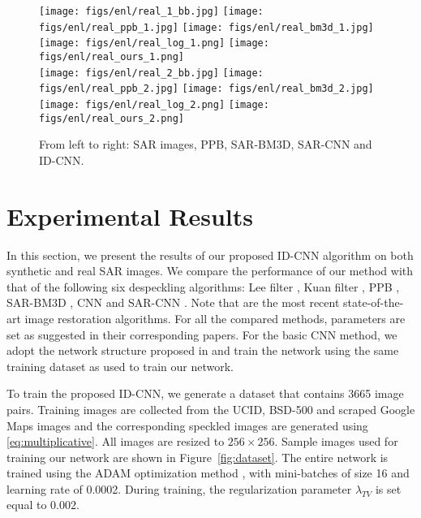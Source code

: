 \documentclass[journal]{IEEEtran}
\begin{document}
\begin{figure*}[htp!]
 \centering
 \texttt{[image: figs/enl/real\_1\_bb.jpg]}
 \texttt{[image: figs/enl/real\_ppb\_1.jpg]}
\texttt{[image: figs/enl/real\_bm3d\_1.jpg]}
\texttt{[image: figs/enl/real\_log\_1.png]}
\texttt{[image: figs/enl/real\_ours\_1.png]}\\
\vspace{0.5em}
 \texttt{[image: figs/enl/real\_2\_bb.jpg]}
 \texttt{[image: figs/enl/real\_ppb\_2.jpg]}
\texttt{[image: figs/enl/real\_bm3d\_2.jpg]}
\texttt{[image: figs/enl/real\_log\_2.png]}
\texttt{[image: figs/enl/real\_ours\_2.png]}\\
 \caption{From left to right: SAR images, PPB, SAR-BM3D, SAR-CNN and ID-CNN.}
\label{fig:real}
\end{figure*}



\section{Experimental Results}\label{sec:results}
In  this  section,  we  present  the  results  of  our  proposed
ID-CNN algorithm on both synthetic and real SAR images.   We compare the performance of our method with that of the following six despeckling algorithms: Lee filter \cite{lee1981speckle}, Kuan filter \cite{kuan1985adaptive}, PPB \cite{ppb}, SAR-BM3D \cite{sarbm3d}, CNN \cite{cnn} and SAR-CNN \cite{sarcnn}.   Note that \cite{ppb, sarbm3d, cnn, sarcnn} are the most recent state-of-the-art image restoration algorithms.  For all the compared methods, parameters are set as suggested in their corresponding papers.  
For the basic CNN method, we adopt the network structure proposed in \cite{cnn} and train the  network using the same training dataset as used to train our network.   

To train the proposed ID-CNN,  we generate a dataset that contains  3665 image pairs. Training images are collected from the UCID, BSD-500 and scraped Google Maps images \cite{pix2pix} and the corresponding speckled images are generated using \eqref{eq:multiplicative}.  All images are resized to $256 \times 256$. Sample images used for training our network are shown in Figure~\ref{fig:dataset}. The entire network is trained  using the ADAM optimization method  \cite{adam_opt}, with mini-batches of size 16 and learning rate of 0.0002. During training, the regularization parameter $\lambda_{TV}$ is set equal to $0.002$.  
\end{document}
